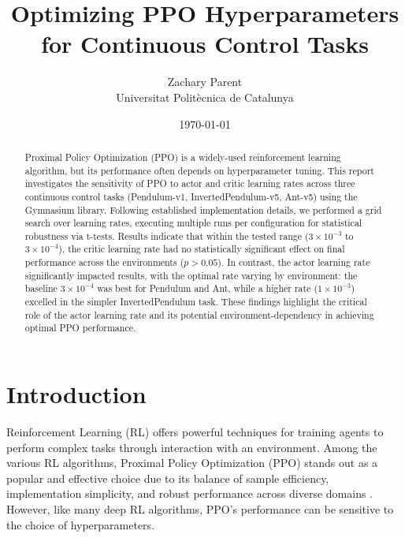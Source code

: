 \documentclass{article}
\title{Optimizing PPO Hyperparameters \\ for Continuous Control Tasks}
\author{Zachary Parent \\ Universitat Politècnica de Catalunya}
\date{\today}
\begin{document}
\begin{titlepage} %
    \maketitle

    \begin{abstract}
    Proximal Policy Optimization (PPO) is a widely-used reinforcement learning algorithm, but its performance often depends on hyperparameter tuning. This report investigates the sensitivity of PPO to actor and critic learning rates across three continuous control tasks (Pendulum-v1, InvertedPendulum-v5, Ant-v5) using the Gymnasium library. Following established implementation details, we performed a grid search over learning rates, executing multiple runs per configuration for statistical robustness via t-tests. Results indicate that within the tested range (\(3 \times 10^{-3}\) to \(3 \times 10^{-4}\)), the critic learning rate had no statistically significant effect on final performance across the environments (\(p > 0.05\)). In contrast, the actor learning rate significantly impacted results, with the optimal rate varying by environment: the baseline \(3 \times 10^{-4}\) was best for Pendulum and Ant, while a higher rate (\(1 \times 10^{-3}\)) excelled in the simpler InvertedPendulum task. These findings highlight the critical role of the actor learning rate and its potential environment-dependency in achieving optimal PPO performance.
    \end{abstract}
    \tableofcontents
    \thispagestyle{empty}

\end{titlepage} %



\section{Introduction}
Reinforcement Learning (RL) offers powerful techniques for training agents to perform complex tasks through interaction with an environment. Among the various RL algorithms, Proximal Policy Optimization (PPO) stands out as a popular and effective choice due to its balance of sample efficiency, implementation simplicity, and robust performance across diverse domains \cite{schulman2017proximalpolicyoptimizationalgorithms}. However, like many deep RL algorithms, PPO's performance can be sensitive to the choice of hyperparameters.
\end{document}
